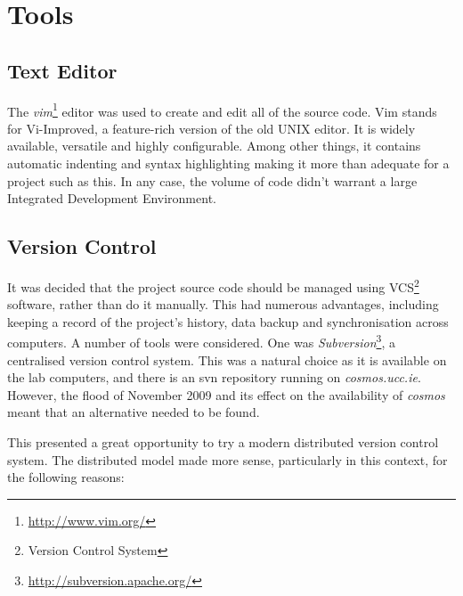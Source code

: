 \section{Tools}

\subsection{Text Editor}

The \emph{vim}\footnote{\url{http://www.vim.org/}} editor was used to create and
edit all of the source code. Vim stands for Vi-Improved, a feature-rich version
of the old UNIX editor. It is widely available, versatile and highly
configurable. Among other things, it contains automatic indenting and syntax
highlighting making it more than adequate for a project such as this. In any
case, the volume of code didn't warrant a large Integrated Development
Environment.

\subsection{Version Control}

It was decided that the project source code should be managed using
VCS\footnote{Version Control System} software, rather than do it manually. This
had numerous advantages, including keeping a record of the project's history,
data backup and synchronisation across computers. A number of tools were
considered. One was
\emph{Subversion}\footnote{\url{http://subversion.apache.org/}}, a centralised
version control system. This was a natural choice as it is available on the lab
computers, and there is an svn repository running on \emph{cosmos.ucc.ie}.
However, the flood of November 2009 and its effect on the availability of
\emph{cosmos} meant that an alternative needed to be found.

This presented a great opportunity to try a modern distributed version control
system. The distributed model made more sense, particularly in this context, for
the following reasons:

